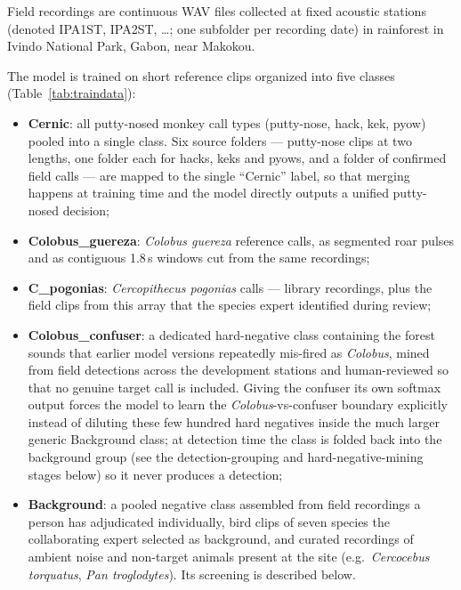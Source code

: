 \documentclass[review,3p,times]{elsarticle}
\begin{document}
Field recordings are continuous WAV files collected at fixed acoustic stations
(denoted IPA1ST, IPA2ST, \dots; one subfolder per recording date) in
rainforest in Ivindo National Park, Gabon, near Makokou.

The model is trained on short reference clips organized into five classes
(Table~\ref{tab:traindata}):
\begin{itemize}
\item \textbf{Cernic}: all putty-nosed monkey call types (putty-nose, hack,
kek, pyow) pooled into a single class. Six source folders --- putty-nose clips
at two lengths, one folder each for hacks, keks and pyows, and a folder of
confirmed field calls --- are mapped to
the single ``Cernic'' label, so that
merging happens at training time and the model directly outputs a unified
putty-nosed decision;
\item \textbf{Colobus\_guereza}: \textit{Colobus guereza} reference calls, as
segmented roar pulses and as contiguous 1.8\,s windows cut from the same
recordings;
\item \textbf{C\_pogonias}: \textit{Cercopithecus pogonias} calls --- library
recordings, plus the field clips from this array that the species expert
identified during review;
\item \textbf{Colobus\_confuser}: a dedicated hard-negative class containing
the forest sounds that earlier model versions repeatedly mis-fired as
\textit{Colobus}, mined from field detections across the development stations
and human-reviewed so that no genuine target call is included.
Giving the confuser its own softmax output forces the model to learn the
\textit{Colobus}-vs-confuser boundary explicitly instead of diluting these few
hundred hard negatives inside the much larger generic Background class; at
detection time the class is folded back into the background group (see
the detection-grouping and hard-negative-mining stages below) so it never
produces a detection;
\item \textbf{Background}: a pooled negative class assembled from field
recordings a person has adjudicated individually, bird clips of seven species
the collaborating expert selected as background, and curated recordings of
ambient noise and non-target animals present at the site (e.g.\
\textit{Cercocebus torquatus}, \textit{Pan troglodytes}). Its screening is
described below.
\end{itemize}
\end{document}
